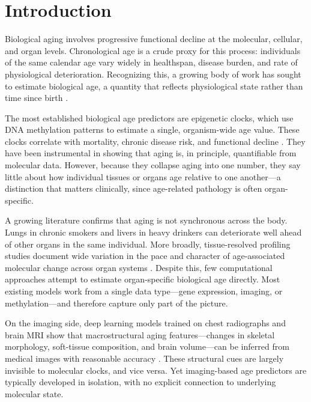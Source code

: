 \documentclass[10pt,twocolumn]{article}
\begin{document}
\section{Introduction}

Biological aging involves progressive functional decline at the molecular, cellular, and organ
levels. Chronological age is a crude proxy for this process: individuals of the same calendar
age vary widely in healthspan, disease burden, and rate of physiological deterioration.
Recognizing this, a growing body of work has sought to estimate biological age, a quantity
that reflects physiological state rather than time since birth \cite{horvath2013,hannum2013}.

The most established biological age predictors are epigenetic clocks, which use DNA methylation
patterns to estimate a single, organism-wide age value. These clocks correlate with mortality,
chronic disease risk, and functional decline \cite{levine2018}. They have been instrumental in
showing that aging is, in principle, quantifiable from molecular data. However, because they
collapse aging into one number, they say little about how individual tissues or organs age
relative to one another---a distinction that matters clinically, since age-related pathology
is often organ-specific.

A growing literature confirms that aging is not synchronous across the body. Lungs in chronic
smokers and livers in heavy drinkers can deteriorate well ahead of other organs in the same
individual. More broadly, tissue-resolved profiling studies document wide variation in the pace
and character of age-associated molecular change across organ systems \cite{zakarpolyak2023}.
Despite this, few computational approaches attempt to estimate organ-specific biological age
directly. Most existing models work from a single data type---gene expression, imaging, or
methylation---and therefore capture only part of the picture.

On the imaging side, deep learning models trained on chest radiographs and brain MRI show that
macrostructural aging features---changes in skeletal morphology, soft-tissue composition, and
brain volume---can be inferred from medical images with reasonable accuracy
\cite{cole2017,rajpurkar2018chexnet}. These structural cues are largely invisible to molecular
clocks, and vice versa. Yet imaging-based age predictors are typically developed in isolation,
with no explicit connection to underlying molecular state.
\end{document}
